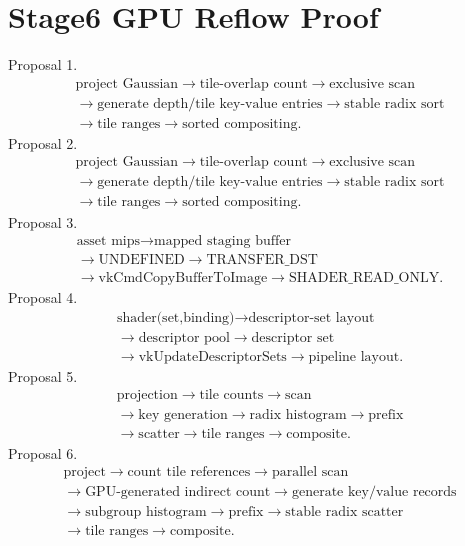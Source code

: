 \documentclass[11pt,twoside]{article}
\begin{document}
\section*{Stage6 GPU Reflow Proof}
\noindent Proposal 1.
\[
\begin{gathered}\text{project Gaussian}\rightarrow\text{tile-overlap count}\rightarrow\text{exclusive scan}\\\rightarrow\text{generate depth/tile key-value entries}\rightarrow\text{stable radix sort}\\\rightarrow\text{tile ranges}\rightarrow\text{sorted compositing}.\end{gathered}
\]
\clearpage
\noindent Proposal 2.
\[
\begin{gathered}\text{project Gaussian}\rightarrow\text{tile-overlap count}\rightarrow\text{exclusive scan}\\\rightarrow\text{generate depth/tile key-value entries}\rightarrow\text{stable radix sort}\\\rightarrow\text{tile ranges}\rightarrow\text{sorted compositing}.\end{gathered}
\]
\clearpage
\noindent Proposal 3.
\[
\begin{gathered}\text{asset mips}\rightarrow\text{mapped staging buffer}\\\rightarrow\text{UNDEFINED}\rightarrow\text{TRANSFER\_DST}\\\rightarrow\text{vkCmdCopyBufferToImage}\rightarrow\text{SHADER\_READ\_ONLY}.\end{gathered}
\]
\clearpage
\noindent Proposal 4.
\[
\begin{gathered}\text{shader(set,binding)}\rightarrow\text{descriptor-set layout}\\\rightarrow\text{descriptor pool}\rightarrow\text{descriptor set}\\\rightarrow\text{vkUpdateDescriptorSets}\rightarrow\text{pipeline layout}.\end{gathered}
\]
\clearpage
\noindent Proposal 5.
\[
\begin{gathered}\text{projection}\rightarrow\text{tile counts}\rightarrow\text{scan}\\\rightarrow\text{key generation}\rightarrow\text{radix histogram}\rightarrow\text{prefix}\\\rightarrow\text{scatter}\rightarrow\text{tile ranges}\rightarrow\text{composite}.\end{gathered}
\]
\clearpage
\noindent Proposal 6.
\[
\begin{gathered}\text{project}\rightarrow\text{count tile references}\rightarrow\text{parallel scan}\\\rightarrow\text{GPU-generated indirect count}\rightarrow\text{generate key/value records}\\\rightarrow\text{subgroup histogram}\rightarrow\text{prefix}\rightarrow\text{stable radix scatter}\\\rightarrow\text{tile ranges}\rightarrow\text{composite}.\end{gathered}
\]
\end{document}
